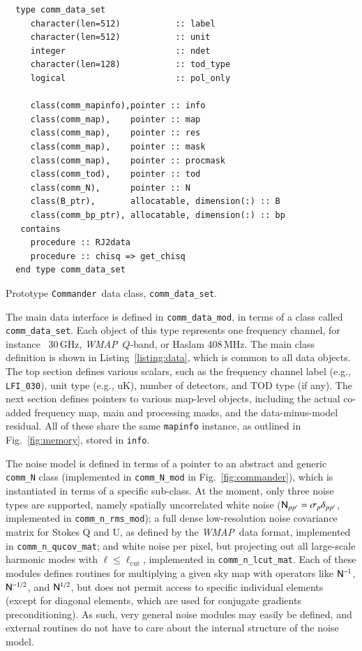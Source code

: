 \documentclass[twocolumn]{aa}
\def\WMAP{\emph{WMAP}}
\def\commander{\texttt{Commander}}
\newcommand{\N}[0]{\tens{N}}
\begin{document}
\begin{lstfloat}[t]
  {\scriptsize
    \begin{tcolorbox}
\begin{lstlisting}
  type comm_data_set
     character(len=512)           :: label
     character(len=512)           :: unit
     integer                      :: ndet
     character(len=128)           :: tod_type
     logical                      :: pol_only

     class(comm_mapinfo),pointer :: info
     class(comm_map),    pointer :: map 
     class(comm_map),    pointer :: res 
     class(comm_map),    pointer :: mask
     class(comm_map),    pointer :: procmask
     class(comm_tod),    pointer :: tod
     class(comm_N),      pointer :: N  
     class(B_ptr),       allocatable, dimension(:) :: B
     class(comm_bp_ptr), allocatable, dimension(:) :: bp
   contains
     procedure :: RJ2data
     procedure :: chisq => get_chisq
  end type comm_data_set
\end{lstlisting}
    \end{tcolorbox}
}
\caption{Prototype \commander\ data class, \texttt{comm\_data\_set}.}\label{listing:data}
\end{lstfloat}

The main data interface is defined in \texttt{comm\_data\_mod}, in
terms of a class called \texttt{comm\_data\_set}. Each object of this
type represents one frequency channel, for instance \Planck\ 30\,GHz,
\WMAP\ $Q$-band, or Haslam 408\,MHz. The main class definition is
shown in Listing~\ref{listing:data}, which is common to all data
objects. The top section defines various scalars, such as the
frequency channel label (e.g., \texttt{LFI\_030}), unit type (e.g.,
uK), number of detectors, and TOD type (if any). The next section
defines pointers to various map-level objects, including the actual
co-added frequency map, main and processing masks, and the
data-minus-model residual. All of these share the same
\texttt{mapinfo} instance, as outlined in Fig.~\ref{fig:memory},
stored in \texttt{info}.

The noise model is defined in terms of a pointer to an abstract and
generic \texttt{comm\_N} class (implemented in \texttt{comm\_N\_mod}
in Fig.~\ref{fig:commander}), which is instantiated in terms of a
specific sub-class. At the moment, only three noise types are
supported, namely spatially uncorrelated white noise ($\N_{pp'} =
\sigma_p\delta_{pp'}$, implemented in \texttt{comm\_n\_rms\_mod}); a
full dense low-resolution noise covariance matrix for Stokes Q and U,
as defined by the \WMAP\ data format, implemented in
\texttt{comm\_n\_qucov\_mat}; and white noise per pixel, but
projecting out all large-scale harmonic modes with
$\ell\le\ell_{\mathrm{cut}}$, implemented in
\texttt{comm\_n\_lcut\_mat}. Each of these modules defines routines
for multiplying a given sky map with operators like $\N^{-1}$,
$\N^{-1/2}$, and $\N^{1/2}$, but does not permit access to specific
individual elements (except for diagonal elements, which are used for
conjugate gradients preconditioning). As such, very general noise
modules may easily be defined, and external routines do not have to
care about the internal structure of the noise model. 
\end{document}
